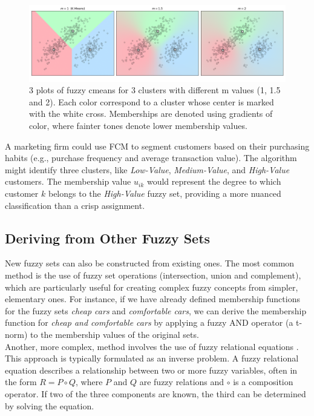 \begin{figure}[!ht]
    \centering
    \begin{adjustwidth}{-1.7cm}{-1cm}
    \includegraphics[width=1.15\textwidth]{ch2/figures/fuzzy_cmeans.png}
\end{adjustwidth}
    \caption{3 plots of fuzzy cmeans for 3 clusters with different m values (1, 1.5 and 2). Each color correspond to a cluster whose center is marked with the white cross. Memberships are denoted using gradients of color, where fainter tones denote lower membership values.}
    \label{fig:fuzzy_cmeans}
\end{figure}

\begin{example}
    A marketing firm could use FCM to segment customers based on their purchasing habits (e.g., purchase frequency and average transaction value). The algorithm might identify three clusters, like \emph{Low-Value}, \emph{Medium-Value}, and \emph{High-Value} customers. The membership value $u_{ik}$ would represent the degree to which customer $k$ belongs to the \emph{High-Value} fuzzy set, providing a more nuanced classification than a crisp assignment.
\end{example}

\subsection{Deriving from Other Fuzzy Sets}
New fuzzy sets can also be constructed from existing ones. The most common method is the use of fuzzy set operations (intersection, union and complement), which are particularly useful for creating complex fuzzy concepts from simpler, elementary ones. For instance, if we have already defined membership functions for the fuzzy sets \emph{cheap cars} and \emph{comfortable cars}, we can derive the membership function for \emph{cheap and comfortable cars} by applying a fuzzy AND operator (a t-norm) to the membership values of the original sets.\\

Another, more complex, method involves the use of fuzzy relational equations \cite[Sec.~3.5]{HistoryFL2017}. This approach is typically formulated as an inverse problem. A fuzzy relational equation describes a relationship between two or more fuzzy variables, often in the form $R = P \circ Q$, where $P$ and $Q$ are fuzzy relations and $\circ$ is a composition operator. If two of the three components are known, the third can be determined by solving the equation.

